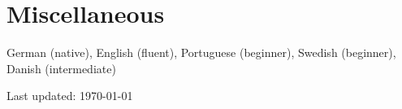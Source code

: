 \documentclass[11pt]{article} %
\begin{document}





\section*{Miscellaneous}

 German (native), English (fluent), Portuguese (beginner), Swedish (beginner), Danish (intermediate)	\\


\begin{center}
	\scriptsize
	Last updated: \today
\end{center}

\end{document}
